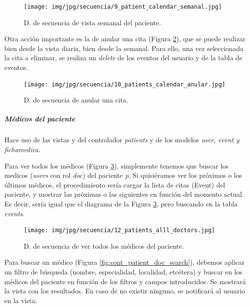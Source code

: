 \documentclass[a4paper,oneside,11pt]{book}
\begin{document}
					\begin{figure}[H]
					  \centering
					    \texttt{[image: img/jpg/secuencia/9\_patient\_calendar\_semanal.jpg]}
					  \caption{D. de secuencia de vista semanal del paciente.}
					  \label{fig:cont_patient_calendar}
					\end{figure}
					
					Otra acción importante es la de anular una cita (Figura \ref{fig:cont_patient_calendar_anular}), que se puede realizar bien desde la vista diaria, bien desde la semanal. Para ello, una vez seleccionada la cita a eliminar, se realiza un \textit{delete} de los eventos del usuario y de la tabla de eventos.
					
					\begin{figure}[H]
					  \centering
					    \texttt{[image: img/jpg/secuencia/10\_patients\_calendar\_anular.jpg]}
					  \caption{D. de secuencia de anular una cita.}
					  \label{fig:cont_patient_calendar_anular}
					\end{figure}
					
			
				\subparagraph{Médicos del paciente} %
				\label{subp:cont_medicos_del_paciente}
				
					Hace uso de las vistas y del controlador \textit{patients} y de los modelos \textit{user, event y fichamedica}.
					
					Para ver todos los médicos (Figura \ref{fig:cont_patient_docs}), simplemente tenemos que buscar los medicos (\textit{users} con rol \textit{doc}) del paciente \textit{p}. Si quisiéramos ver los próximos o los últimos médicos, el procedimiento sería cargar la lista de citas (Event) del paciente, y mostrar las próximas o las siguientes en función del momento actual. Es decir, sería igual que el diagrama de la Figura \ref{fig:cont_patient_docs}, pero buscando en la tabla \textit{events}.
					
					\begin{figure}[H]
					  \centering
					    \texttt{[image: img/jpg/secuencia/12\_patients\_alll\_doctors.jpg]}
					  \caption{D. de secuencia de ver todos los médicos del paciente.}
					  \label{fig:cont_patient_docs}
					\end{figure} 
					
					Para buscar un médico (Figura \ref{fig:cont_patient_doc_search}), debemos aplicar un filtro de búsqueda (nombre, especialidad, localidad, etcétera) y buscar en los médicos del paciente en función de los filtros y campos introducidos. Se mostrará la vista con los resultados. En caso de no existir ninguno, se notificará al usuario en la vista.
					
\end{document}
